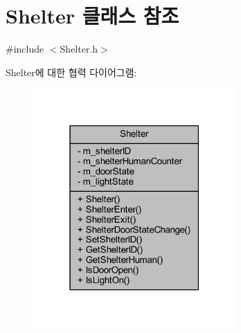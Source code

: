 \hypertarget{class_shelter}{}\section{Shelter 클래스 참조}
\label{class_shelter}


{\ttfamily \#include $<$Shelter.\+h$>$}



Shelter에 대한 협력 다이어그램\+:\nopagebreak
\begin{figure}[H]
\begin{center}
\leavevmode
\includegraphics[width=219pt]{class_shelter__coll__graph}
\end{center}
\end{figure}
